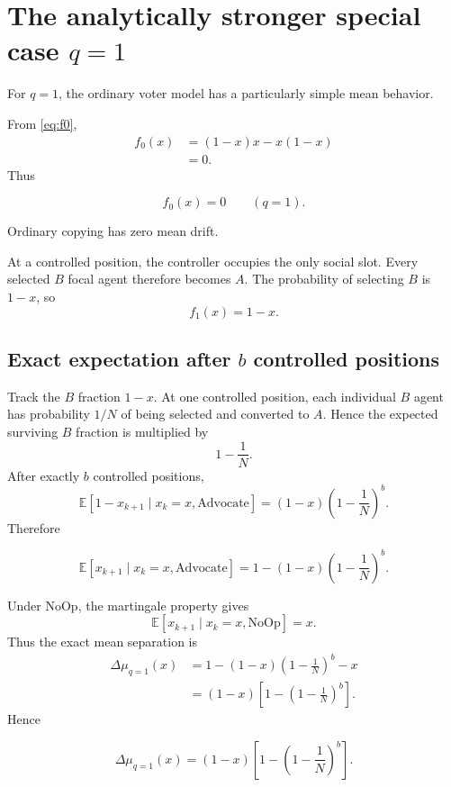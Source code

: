 \documentclass[11pt,a4paper]{article}
\newcommand{\Adv}{\ensuremath{\mathrm{Advocate}}}
\newcommand{\NoOp}{\ensuremath{\mathrm{NoOp}}}
\newcommand{\E}{\mathbb{E}}
\newcommand{\1}{\mathbbm{1}}
\begin{document}
\section{The analytically stronger special case $q=1$}

For $q=1$, the ordinary voter model has a particularly simple mean behavior.

From \cref{eq:f0},
\begin{align}
f_0(x)
&=(1-x)x-x(1-x)\\
&=0.
\end{align}
Thus
\begin{resultbox}
\begin{equation}
\boxed{f_0(x)=0\qquad(q=1).}
\end{equation}
\end{resultbox}
Ordinary copying has zero mean drift.

At a controlled position, the controller occupies the only social slot. Every selected $B$ focal agent therefore becomes $A$. The probability of selecting $B$ is $1-x$, so
\begin{equation}
f_1(x)=1-x.
\end{equation}

\subsection{Exact expectation after $b$ controlled positions}

Track the $B$ fraction $1-x$. At one controlled position, each individual $B$ agent has probability $1/N$ of being selected and converted to $A$. Hence the expected surviving $B$ fraction is multiplied by
\[
1-\frac1N.
\]
After exactly $b$ controlled positions,
\begin{equation}
\E[1-x_{k+1}\mid x_k=x,\Adv]
=(1-x)\left(1-\frac1N\right)^b.
\end{equation}
Therefore
\begin{resultbox}
\begin{equation}
\boxed{
\E[x_{k+1}\mid x_k=x,\Adv]
=1-(1-x)\left(1-\frac1N\right)^b.}
\label{eq:q1meanadv}
\end{equation}
\end{resultbox}
Under $\NoOp$, the martingale property gives
\begin{equation}
\E[x_{k+1}\mid x_k=x,\NoOp]=x.
\end{equation}
Thus the exact mean separation is
\begin{align}
\Delta\mu_{q=1}(x)
&=1-(1-x)\left(1-\frac1N\right)^b-x\\
&=(1-x)\left[1-\left(1-\frac1N\right)^b\right].
\end{align}
Hence
\begin{resultbox}
\begin{equation}
\boxed{
\Delta\mu_{q=1}(x)
=(1-x)\left[1-\left(1-\frac1N\right)^b\right].}
\label{eq:q1deltamu}
\end{equation}
\end{resultbox}
\end{document}

